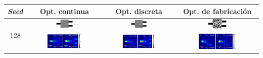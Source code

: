 \begin{landscape}
\begin{table}[ht]
    \centering
    \vspace*{-2.5cm}
    \hspace*{-5cm}
    \begin{tabular}{|c|c|c|c|}
    \hline 
    \emph{Seed} & Opt. continua & Opt. discreta &  Opt. de fabricación \\
    \hline
      \multirow{2}{*}{128} &
      \includegraphics[width=0.24\textwidth]{image/results/wdm/MMA/visualize_eps_cont_128.png} &
      \includegraphics[width=0.24\textwidth]{image/results/wdm/MMA/visualize_eps_disc_128.png} &
      \includegraphics[width=0.24\textwidth]{image/results/wdm/MMA/visualize_eps_fab_128.png} \\
      \cline{2-4}
      &
      \includegraphics[width=0.50\textwidth]{image/results/wdm/MMA/visualize_field_cont_128.png} &
      \includegraphics[width=0.50\textwidth]{image/results/wdm/MMA/visualize_field_disc_128.png} &
      \includegraphics[width=0.50\textwidth]{image/results/wdm/MMA/visualize_field_fab_128.png} \\

\end{tabular}
\end{table}
\end{landscape}
